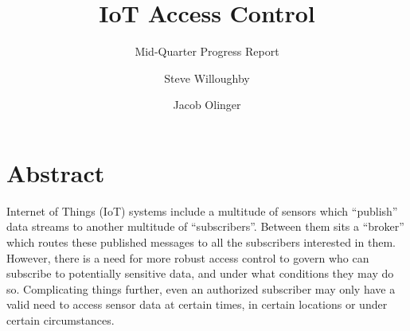 \documentclass[sigconf, nonacm]{acmart}
\begin{document}
\title{IoT Access Control}
\subtitle{Mid-Quarter Progress Report}

\author{Steve Willoughby}
\author{Jacob Olinger}
\maketitle
\section{Abstract}
Internet of Things (IoT) systems include a multitude of sensors which ``publish''
data streams to another multitude of ``subscribers''. Between them sits a ``broker''
which routes these published messages to all the subscribers interested in them.
However, there is a need for more robust access control to govern who can
subscribe to potentially sensitive data, and under what conditions they may do so.
Complicating things further, even an authorized subscriber may only have a valid
need to access sensor data at certain times, in certain locations or under certain
circumstances.
\end{document}
